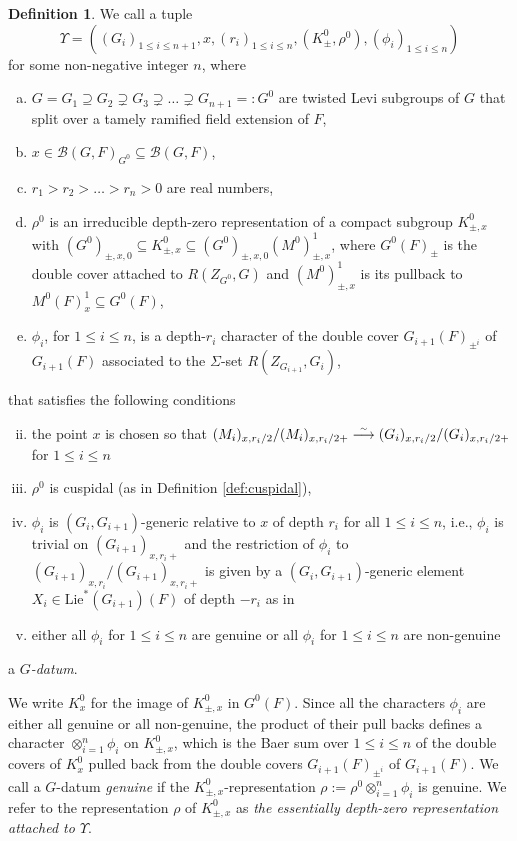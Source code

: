 \documentclass{article}
\def\simto{\buildrel\hbox{\tiny{$\sim$}}\over\longrightarrow}
\newcommand{\cB}{\mathcal{B}}
\theoremstyle{definition}
\newtheorem{dfn}[thm]{Definition}
\numberwithin{equation}{subsection}
\renewcommand{\-}{\hyp{}}
\begin{document}
\begin{dfn}\label{dfn:Gdatum} 
	We call a tuple 
	\[\Upsilon= ((G_i)_{1\leq i\leq n+1},x,(r_i)_{1\leq i\leq n},(K^0_{\pm},\rho^0),(\phi_i)_{1\leq i\leq n}) \]
	for some non-negative integer $n$, where  
	\begin{enumerate}[(a)]
		\item $G=G_1 \supseteq G_2 \supsetneq G_3 \supsetneq \hdots \supsetneq G_{n+1}=:G^0$ are twisted Levi subgroups of $G$ that split over a tamely ramified field extension of $F$,
		\item  $x \in \cB(G,F)_{G^0} \subseteq \cB(G,F)$, 
		\item $r_1 > r_2 > \hdots > r_n >0$ are real numbers,
		\item \label{item:rhotypes} $\rho^0$ is an irreducible depth-zero representation of a compact subgroup $K^0_{\pm, x}$ with $(G^0)_{\pm, x, 0} \subseteq K^0_{\pm, x} \subseteq (G^0)_{\pm, x, 0}(M^0)^1_{\pm, x}$, where $G^0(F)_{\pm}$ is the double cover attached to $R(Z_{G^0}, G)$ and $(M^0)^1_{\pm,x}$ is its pullback to $M^0(F)^1_x \subseteq G^0(F)$,
		\item	$\phi_i$, for $1 \leq i \leq n$, is a depth-$r_i$ character of the double cover $G_{i+1}(F)_{\pm^i}$ of $G_{i+1}(F)$ associated to the $\Sigma$-set $R(Z_{G_{i+1}},G_i)$, 
	\end{enumerate}
	that satisfies the following conditions 
	\begin{enumerate}[(i)]
		\setcounter{enumi}{1}
\item the point $x$ is chosen so that $(M_i)_{x,r_i/2}/(M_i)_{x,r_i/2+}\simto (G_i)_{x,r_i/2}/(G_i)_{x,r_i/2+}$ for $1 \leq i \leq n$
		\item  $\rho^0$ is cuspidal (as in Definition \ref{def:cuspidal}),
		\item $\phi_i$ is $(G_i, G_{i+1})$-generic relative to $x$ of depth $r_i$ for all $1 \leq i \leq n$, i.e., $\phi_i$ is trivial on $(G_{i+1})_{x,r_i+}$ and the restriction of $\phi_i$ to $(G_{i+1})_{x,r_i}/(G_{i+1})_{x,r_i+}$ is given by a $(G_i, G_{i+1})$-generic element $X_i \in \mathrm{Lie}^*(G_{i+1})(F)$ of depth $-r_i$ as in \cite[Definition~3.8]{Fintzen-IHES} \item either all $\phi_i$ for $1 \leq i \leq n$ are genuine or all $\phi_i$ for $1 \leq i \leq n$ are non-genuine 
	\end{enumerate}
	a \emph{$G$-datum}.
	
	We write $K^0_x$ for the image of $K^0_{\pm, x}$ in $G^0(F)$. 
	Since all the characters $\phi_i$ are either all genuine or all non-genuine, the product of their pull backs defines a character $\otimes_{i=1}^n \phi_i$ on $K^0_{\pm,x}$, which is the Baer sum  over $1 \leq i \leq n$ of the double covers of $K^0_x$ pulled back from the double covers $G_{i+1}(F)_{\pm^i}$ of $G_{i+1}(F)$.
	We call a $G$-datum \emph{genuine} if the $K^0_{\pm, x}$-representation $\rho:=\rho^0 \otimes_{i=1}^n \phi_i$ is genuine. 
	We refer to the representation $\rho$ of $K^0_{\pm,x}$ as \emph{the essentially depth-zero representation attached to $\Upsilon$}.
	

\end{dfn}
\end{document}
